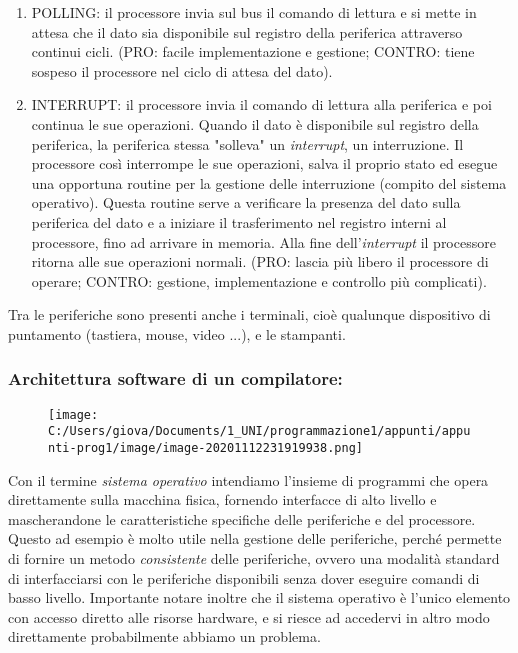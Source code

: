 \documentclass[
]{article}
\begin{document}
\begin{enumerate}
\def\labelenumi{\arabic{enumi}.}
\item
  POLLING: il processore invia sul bus il comando di lettura e si mette
  in attesa che il dato sia disponibile sul registro della periferica
  attraverso continui cicli. (PRO: facile implementazione e gestione;
  CONTRO: tiene sospeso il processore nel ciclo di attesa del dato).
\item
  INTERRUPT: il processore invia il comando di lettura alla periferica e
  poi continua le sue operazioni. Quando il dato è disponibile sul
  registro della periferica, la periferica stessa "solleva" un
  \emph{interrupt}, un interruzione. Il processore così interrompe le
  sue operazioni, salva il proprio stato ed esegue una opportuna routine
  per la gestione delle interruzione (compito del sistema operativo).
  Questa routine serve a verificare la presenza del dato sulla
  periferica del dato e a iniziare il trasferimento nel registro interni
  al processore, fino ad arrivare in memoria. Alla fine
  dell'\emph{interrupt} il processore ritorna alle sue operazioni
  normali. (PRO: lascia più libero il processore di operare; CONTRO:
  gestione, implementazione e controllo più complicati).
\end{enumerate}

Tra le periferiche sono presenti anche i terminali, cioè qualunque
dispositivo di puntamento (tastiera, mouse, video ...), e le stampanti.

\hypertarget{header-n285}{%
\subsubsection{Architettura software di un
compilatore:}\label{header-n285}}

\begin{figure}
\centering
\texttt{[image: C:/Users/giova/Documents/1\_UNI/programmazione1/appunti/appunti-prog1/image/image-20201112231919938.png]}
\caption{}
\end{figure}

Con il termine \emph{sistema operativo} intendiamo l'insieme di
programmi che opera direttamente sulla macchina fisica, fornendo
interfacce di alto livello e mascherandone le caratteristiche specifiche
delle periferiche e del processore. Questo ad esempio è molto utile
nella gestione delle periferiche, perché permette di fornire un metodo
\emph{consistente} delle periferiche, ovvero una modalità standard di
interfacciarsi con le periferiche disponibili senza dover eseguire
comandi di basso livello. Importante notare inoltre che il sistema
operativo è l'unico elemento con accesso diretto alle risorse hardware,
e si riesce ad accedervi in altro modo direttamente probabilmente
abbiamo un problema.
\end{document}
